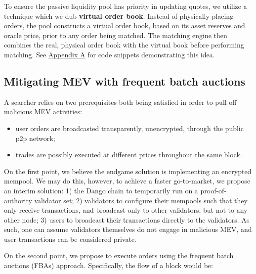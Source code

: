 \documentclass{article}
\begin{document}
To ensure the passive liquidity pool has priority in updating quotes, we utilize a technique which we dub \textbf{virtual order book}. Instead of physically placing orders, the pool constructs a virtual order book, based on its asset reserves and oracle price, prior to any order being matched. The matching engine then combines the real, physical order book with the virtual book before performing matching. See \hyperref[sec:appendixa]{Appendix A} for code snippets demonstrating this idea.

\subsection{Mitigating MEV with frequent batch auctions}

A searcher relies on two prerequisites both being satisfied in order to pull off malicious MEV activities:

\begin{itemize}
  \item user orders are broadcasted transparently, unencrypted, through the public p2p network;
  \item trades are possibly executed at different prices throughout the same block.
\end{itemize}

On the first point, we believe the endgame solution is implementing an encrypted mempool.\supercite{encryptedmempool} We may do this, however, to achieve a faster go-to-market, we propose an interim solution: 1) the Dango chain to temporarily run on a proof-of-authority validator set; 2) validators to configure their mempools such that they only receive transactions, and broadcast only to other validators, but not to any other node; 3) users to broadcast their transactions directly to the validators. As such, one can assume validators themselves do not engage in malicious MEV, and user transactions can be considered private.

On the second point, we propose to execute orders using the frequent batch auctions (FBAs) approach.\supercite{frequentbatchauctions,frequentbatchauctions2} Specifically, the flow of a block would be:
\end{document}
